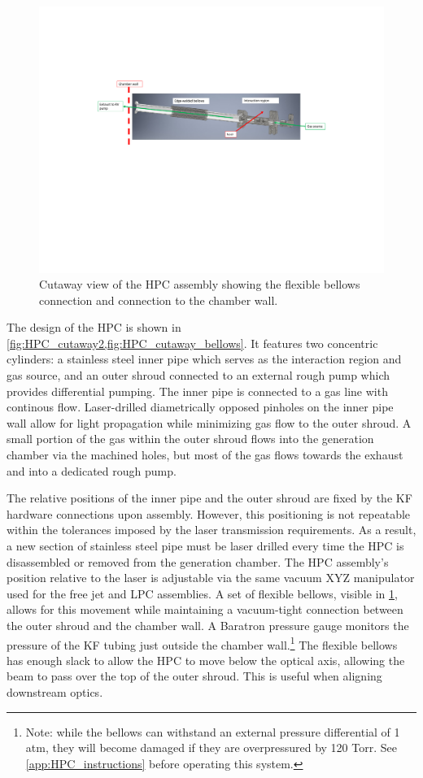 \begin{figure}
	\centering
	\includegraphics[width=1.0\textwidth]{figures/chap3/HPC_cutaway_bellows.pdf}
	\caption{Cutaway view of the HPC assembly showing the flexible bellows connection and connection to the chamber wall.}
	\label{fig:HPC_cutaway_bellows}
\end{figure}

The design of the HPC is shown in \cref{fig:HPC_cutaway2,fig:HPC_cutaway_bellows}. It features two concentric cylinders: a stainless steel inner pipe which serves as the interaction region and gas source, and an outer shroud connected to an external rough pump which provides differential pumping. The inner pipe is connected to a gas line with continous flow. Laser-drilled diametrically opposed pinholes on the inner pipe wall allow for light propagation while minimizing gas flow to the outer shroud. A small portion of the gas within the outer shroud flows into the generation chamber via the machined holes, but most of the gas flows towards the exhaust and into a dedicated rough pump.

The relative positions of the inner pipe and the outer shroud are fixed by the KF hardware connections upon assembly. However, this positioning is not repeatable within the tolerances imposed by the laser transmission requirements. As a result, a new section of stainless steel pipe must be laser drilled every time the HPC is disassembled or removed from the generation chamber. The HPC assembly's position relative to the laser is adjustable via the same vacuum XYZ manipulator used for the free jet and LPC assemblies. A set of flexible bellows, visible in \cref{fig:HPC_cutaway_bellows}, allows for this movement while maintaining a vacuum-tight connection between the outer shroud and the chamber wall. A Baratron pressure gauge monitors the pressure of the KF tubing just outside the chamber wall.\footnote{Note: while the bellows can withstand an external pressure differential of 1 atm, they will become damaged if they are overpressured by 120 Torr. See \cref{app:HPC_instructions} before operating this system.} The flexible bellows has enough slack to allow the HPC to move below the optical axis, allowing the beam to pass over the top of the outer shroud. This is useful when aligning downstream optics.

